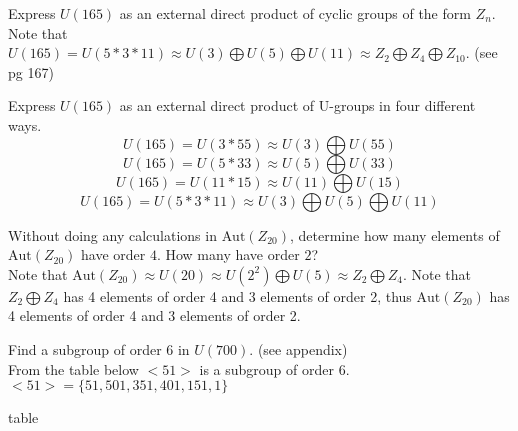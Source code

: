 \documentclass[12pt]{article}
\makeatletter
\theoremstyle{homework}
\newenvironment{exercise}[1]
{\def\@currentlabel{#1}\exercisecore}
{\endexercisecore}
\makeatother
\begin{document}
\begin{exercise}{8.66}
Express $U(165)$ as an external direct product of cyclic groups of the form $Z_n$.\\
Note that $U(165)=U(5*3*11)\approx U(3)\bigoplus U(5)\bigoplus U(11)\approx Z_2\bigoplus Z_4\bigoplus Z_{10}$.  (see pg 167)
\end{exercise}

\begin{exercise}{8.67}
Express $U(165)$ as an external direct product of U-groups in four different ways.\\
$$U(165)=U(3*55)\approx U(3)\bigoplus U(55)$$
$$U(165)=U(5*33)\approx U(5)\bigoplus U(33)$$
$$U(165)=U(11*15)\approx U(11)\bigoplus U(15)$$
$$U(165)=U(5*3*11)\approx U(3)\bigoplus U(5)\bigoplus U(11)$$
\end{exercise}

\begin{exercise}{8.68}
Without doing any calculations in $\text{Aut}(Z_{20})$, determine how many elements of $\text{Aut}(Z_{20})$ have order $4$. How many have order $2$?\\
Note that $\text{Aut}(Z_{20})\approx U(20)\approx U(2^2)\bigoplus U(5)\approx Z_2\bigoplus Z_{4}$.  Note that $Z_2\bigoplus Z_{4}$ has 4 elements of order 4 and 3 elements of order 2, thus $\text{Aut}(Z_{20})$ has 4 elements of order 4 and 3 elements of order 2.
\end{exercise}

\begin{exercise}{8.78}
Find a subgroup of order 6 in $U(700)$. (see appendix)\\
From the table below $<51>$ is a subgroup of order 6.
$<51>=\{51,501,351,401,151,1\}$

\end{exercise}


\newpage
table

\end{document}
